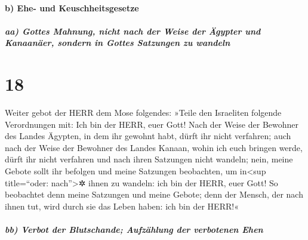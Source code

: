 \hypertarget{b-ehe--und-keuschheitsgesetze}{%
\paragraph{b) Ehe- und
Keuschheitsgesetze}\label{b-ehe--und-keuschheitsgesetze}}

\hypertarget{aa-gottes-mahnung-nicht-nach-der-weise-der-uxe4gypter-und-kanaanuxe4er-sondern-in-gottes-satzungen-zu-wandeln}{%
\subparagraph{aa) Gottes Mahnung, nicht nach der Weise der Ägypter und
Kanaanäer, sondern in Gottes Satzungen zu
wandeln}\label{aa-gottes-mahnung-nicht-nach-der-weise-der-uxe4gypter-und-kanaanuxe4er-sondern-in-gottes-satzungen-zu-wandeln}}

\hypertarget{section-17}{%
\section{18}\label{section-17}}

Weiter gebot der HERR dem Mose folgendes:
»Teile den Israeliten folgende Verordnungen mit: Ich bin
der HERR, euer Gott! Nach der Weise der Bewohner des
Landes Ägypten, in dem ihr gewohnt habt, dürft ihr nicht verfahren; auch
nach der Weise der Bewohner des Landes Kanaan, wohin ich euch bringen
werde, dürft ihr nicht verfahren und nach ihren Satzungen nicht wandeln;
nein, meine Gebote sollt ihr befolgen und meine Satzungen
beobachten, um in\textless sup title=``oder: nach''\textgreater✲ ihnen
zu wandeln: ich bin der HERR, euer Gott! So beobachtet
denn meine Satzungen und meine Gebote; denn der Mensch, der nach ihnen
tut, wird durch sie das Leben haben: ich bin der HERR!«

\hypertarget{bb-verbot-der-blutschande-aufzuxe4hlung-der-verbotenen-ehen}{%
\subparagraph{bb) Verbot der Blutschande; Aufzählung der verbotenen
Ehen}\label{bb-verbot-der-blutschande-aufzuxe4hlung-der-verbotenen-ehen}}

